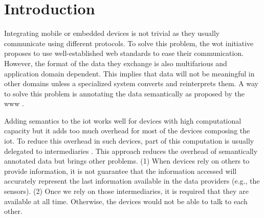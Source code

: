 \section{Introduction}

% 

Integrating mobile or embedded devices is not trivial as they usually communicate using different protocols.
To solve this problem, the \acl{wot} initiative proposes to use well-established web standards to ease their communication.
However, the format of the data they exchange is also multifarious and application domain dependent.
This implies that data will not be meaningful in other domains unless a specialized system converts and reinterprets them.
A way to solve this problem is annotating the data semantically as proposed by the \ac{www} \citep{ChuaG10,kimKC11}.

Adding semantics to the \ac{iot} works well for devices with high computational capacity but it adds too much overhead for most of the devices composing the \ac{iot}.
To reduce this overhead in such devices, part of this computation is usually delegated to intermediaries \citep{honkola_smart-m3_2010}.
This approach reduces the overhead of semantically annotated data but brings other problems.
(1) When devices rely on others to provide information, it is not guarantee that the information accessed will accurately represent the last information available in the data providers (e.g., the sensors).
(2) Once we rely on those intermediaries, it is required that they are available at all time.
Otherwise, the devices would not be able to talk to each other.


